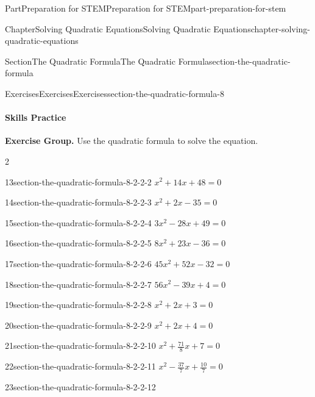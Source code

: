 \documentclass[twoside,10pt,]{book}
\numberwithin{equation}{section}
\begin{document}
\begin{partptx}{Part}{Preparation for STEM}{}{Preparation for STEM}{}{}{part-preparation-for-stem}
\begin{chapterptx}{Chapter}{Solving Quadratic Equations}{}{Solving Quadratic Equations}{}{}{chapter-solving-quadratic-equations}
\begin{sectionptx}{Section}{The Quadratic Formula}{}{The Quadratic Formula}{}{}{section-the-quadratic-formula}
\begin{exercises-subsection}{Exercises}{Exercises}{}{Exercises}{}{}{section-the-quadratic-formula-8}
\paragraph{Skills Practice}\hypertarget{section-the-quadratic-formula-8-2}{}
\par\medskip\noindent%
\textbf{Exercise Group.}\space\space%
Use the quadratic formula to solve the equation.%
\begin{exercisegroupcol}{2}
\begin{divisionexerciseegcol}{13}{}{}{section-the-quadratic-formula-8-2-2-2}%
\({x^{2}+14x+48}=0\)%
\end{divisionexerciseegcol}%
\begin{divisionexerciseegcol}{14}{}{}{section-the-quadratic-formula-8-2-2-3}%
\({x^{2}+2x-35}=0\)%
\end{divisionexerciseegcol}%
\begin{divisionexerciseegcol}{15}{}{}{section-the-quadratic-formula-8-2-2-4}%
\({3x^{2}-28x+49}=0\)%
\end{divisionexerciseegcol}%
\begin{divisionexerciseegcol}{16}{}{}{section-the-quadratic-formula-8-2-2-5}%
\({8x^{2}+23x-36}=0\)%
\end{divisionexerciseegcol}%
\begin{divisionexerciseegcol}{17}{}{}{section-the-quadratic-formula-8-2-2-6}%
\({45x^{2}+52x-32}=0\)%
\end{divisionexerciseegcol}%
\begin{divisionexerciseegcol}{18}{}{}{section-the-quadratic-formula-8-2-2-7}%
\({56x^{2}-39x+4}=0\)%
\end{divisionexerciseegcol}%
\begin{divisionexerciseegcol}{19}{}{}{section-the-quadratic-formula-8-2-2-8}%
\({x^{2}+2x+3}=0\)%
\end{divisionexerciseegcol}%
\begin{divisionexerciseegcol}{20}{}{}{section-the-quadratic-formula-8-2-2-9}%
\({x^{2}+2x+4}=0\)%
\end{divisionexerciseegcol}%
\begin{divisionexerciseegcol}{21}{}{}{section-the-quadratic-formula-8-2-2-10}%
\({x^{2}+{\frac{71}{8}}x+7}=0\)%
\end{divisionexerciseegcol}%
\begin{divisionexerciseegcol}{22}{}{}{section-the-quadratic-formula-8-2-2-11}%
\({x^{2} - {\frac{37}{7}}x+{\frac{10}{7}}}=0\)%
\end{divisionexerciseegcol}%
\begin{divisionexerciseegcol}{23}{}{}{section-the-quadratic-formula-8-2-2-12}%

\end{divisionexerciseegcol}
\end{exercisegroupcol}
\end{exercises-subsection}
\end{sectionptx}
\end{chapterptx}
\end{partptx}
\end{document}
